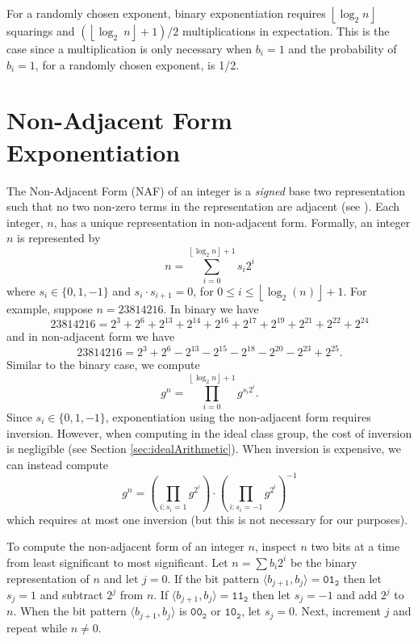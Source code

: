 \documentclass{ucalgthes1}
\theoremstyle{definition}
\newcommand{\floor}[1]{\left\lfloor #1 \right\rfloor}
\newcommand{\binary}[1]{\texttt{#1}_\texttt{2}}
\begin{document}
For a randomly chosen exponent, binary exponentiation requires $\floor{\log_2 n}$ squarings and $\left(\floor{\log_2~n} + 1 \right)/2$ multiplications in expectation.  This is the case since a multiplication is only necessary when $b_i = 1$ and the probability of $b_i = 1$, for a randomly chosen exponent, is 1/2.


\section{Non-Adjacent Form Exponentiation}
\label{sec:naf}

The Non-Adjacent Form (NAF) of an integer is a \emph{signed} base two representation such that no two non-zero terms in the representation are adjacent (see \cite[\S 9.1.4]{Cohen2006}).  Each integer, $n$, has a unique representation in non-adjacent form. Formally, an integer $n$ is represented by
\[
	n = \sum_{i=0}^{\floor{\log_2 n}+1} s_i 2^i
\]
where $s_i \in \{0, 1, -1\}$ and $s_i \cdot s_{i+1} = 0$, for $0 \le i \le \floor{\log_2(n)} + 1$.  For example, suppose $n = 23814216$.  In binary we have
\begin{equation}
\label{eq:binaryEg}
	23814216 = 2^3+2^6+2^{13}+2^{14}+2^{16}+2^{17}+2^{19}+2^{21}+2^{22}+2^{24}
\end{equation}
and in non-adjacent form we have
\begin{equation}
\label{eq:nafEg}
	23814216 = 2^3+2^6-2^{13}-2^{15}-2^{18}-2^{20}-2^{23}+2^{25}.
\end{equation}
Similar to the binary case, we compute
\begin{equation}
\label{eq:nafWithInv}
	g^n = \prod _{i=0}^{\floor{\log_2 n}+1} g^{s_i 2^i}.
\end{equation}
Since $s_i \in \{0, 1, -1\}$, exponentiation using the non-adjacent form requires inversion.  However, when computing in the ideal class group, the cost of inversion is negligible (see Section \ref{sec:idealArithmetic}).  When inversion is expensive, we can instead compute
\[
	g^n = \left( \prod_{i : s_i=1} g^{2^i} \right) \cdot \left( \prod_{i : s_i=-1} g^{2^i} \right)^{-1}
\]
which requires at most one inversion (but this is not necessary for our purposes).

To compute the non-adjacent form of an integer $n$, inspect $n$ two bits at a time from least significant to most significant.  Let $n=\sum b_i2^i$ be the binary representation of $n$ and let $j=0$.  If the bit pattern $\langle b_{j+1}, b_j \rangle = \binary{01}$ then let $s_j = 1$ and subtract $2^j$ from $n$.  If $\langle b_{j+1}, b_j \rangle = \binary{11}$ then let $s_j = -1$ and add $2^j$ to $n$.  When the bit pattern $\langle b_{j+1}, b_j \rangle$ is $\binary{00}$ or $\binary{10}$, let $s_j = 0$. Next, increment $j$ and repeat while $n \ne 0$.
\end{document}
